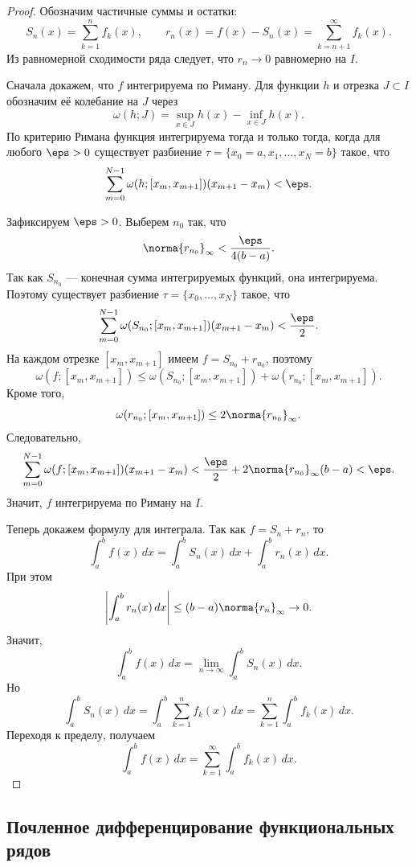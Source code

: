 \begin{proof}
	Обозначим частичные суммы и остатки:
	\[
	S_n(x)=\sum_{k=1}^{n}f_k(x),
	\qquad
	r_n(x)=f(x)-S_n(x)=\sum_{k=n+1}^{\infty}f_k(x).
	\]
	Из равномерной сходимости ряда следует, что $r_n\to0$ равномерно на $I$.
	
	Сначала докажем, что $f$ интегрируема по Риману. Для функции $h$ и отрезка $J\subset I$ обозначим её колебание на $J$ через
	\[
	\omega(h;J)=\sup_{x\in J}h(x)-\inf_{x\in J}h(x).
	\]
	По критерию Римана функция интегрируема тогда и только тогда, когда для любого $\eps>0$ существует разбиение $\tau=\{x_0=a,x_1,\ldots,x_N=b\}$ такое, что
	\[
	\sum_{m=0}^{N-1}\omega(h;[x_m,x_{m+1}])(x_{m+1}-x_m)<\eps.
	\]
	
	Зафиксируем $\eps>0$. Выберем $n_0$ так, что
	\[
	\norma{r_{n_0}}_{\infty}<\frac{\eps}{4(b-a)}.
	\]
	Так как $S_{n_0}$ --- конечная сумма интегрируемых функций, она интегрируема. Поэтому существует разбиение $\tau=\{x_0,\ldots,x_N\}$ такое, что
	\[
	\sum_{m=0}^{N-1}
	\omega(S_{n_0};[x_m,x_{m+1}])(x_{m+1}-x_m)
	<\frac{\eps}{2}.
	\]
	На каждом отрезке $[x_m,x_{m+1}]$ имеем $f=S_{n_0}+r_{n_0}$, поэтому
	\[
	\omega(f;[x_m,x_{m+1}])
	\le
	\omega(S_{n_0};[x_m,x_{m+1}])
	+
	\omega(r_{n_0};[x_m,x_{m+1}]).
	\]
	Кроме того,
	\[
	\omega(r_{n_0};[x_m,x_{m+1}])
	\le 2\norma{r_{n_0}}_{\infty}.
	\]
	Следовательно,
	\[
	\sum_{m=0}^{N-1}\omega(f;[x_m,x_{m+1}])(x_{m+1}-x_m)
	<
	\frac{\eps}{2}
	+
	2\norma{r_{n_0}}_{\infty}(b-a)
	<\eps.
	\]
	Значит, $f$ интегрируема по Риману на $I$.
	
	Теперь докажем формулу для интеграла. Так как $f=S_n+r_n$, то
	\[
	\int_a^b f(x)\,dx
	=
	\int_a^b S_n(x)\,dx
	+
	\int_a^b r_n(x)\,dx.
	\]
	При этом
	\[
	\left|\int_a^b r_n(x)\,dx\right|
	\le
	(b-a)\norma{r_n}_{\infty}
	\to0.
	\]
	Значит,
	\[
	\int_a^b f(x)\,dx
	=
	\lim_{n\to\infty}\int_a^b S_n(x)\,dx.
	\]
	Но
	\[
	\int_a^b S_n(x)\,dx
	=
	\int_a^b \sum_{k=1}^{n}f_k(x)\,dx
	=
	\sum_{k=1}^{n}\int_a^b f_k(x)\,dx.
	\]
	Переходя к пределу, получаем
	\[
	\int_a^b f(x)\,dx
	=
	\sum_{k=1}^{\infty}\int_a^b f_k(x)\,dx.
	\]
\end{proof}

\subsection{Почленное дифференцирование функциональных рядов}


